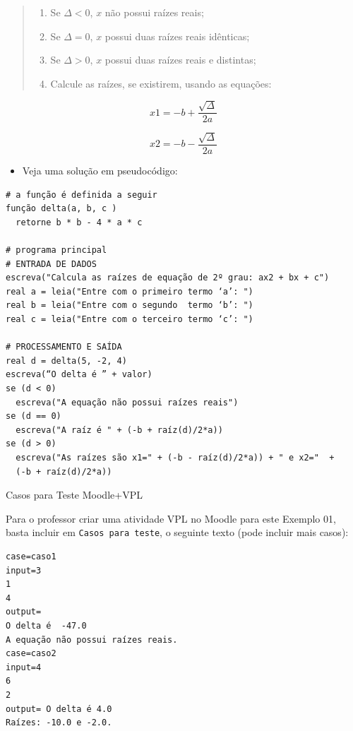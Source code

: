 \documentclass[12pt,a4paper]{article}
\providecommand{\tightlist}{%
      \setlength{\itemsep}{0pt}\setlength{\parskip}{0pt}}
\begin{document}
\begin{quote}
\begin{enumerate}
\def\labelenumi{\arabic{enumi}.}
\tightlist
\item
  Se \(\Delta<0\), \(x\) não possui raízes reais;
\item
  Se \(\Delta=0\), \(x\) possui duas raízes reais idênticas;
\item
  Se \(\Delta>0\), \(x\) possui duas raízes reais e distintas;
\item
  Calcule as raízes, se existirem, usando as equações:
\end{enumerate}
\end{quote}

\[x1 = -b+\frac{\sqrt{\Delta}}{2a}\]

\[x2 = -b-\frac{\sqrt{\Delta}}{2a}\]

\begin{itemize}
\tightlist
\item
  Veja uma solução em pseudocódigo:
\end{itemize}

    \begin{verbatim}
# a função é definida a seguir
função delta(a, b, c )
  retorne b * b - 4 * a * c

# programa principal  
# ENTRADA DE DADOS
escreva("Calcula as raízes de equação de 2º grau: ax2 + bx + c")
real a = leia("Entre com o primeiro termo ‘a’: ")
real b = leia("Entre com o segundo  termo ‘b’: ")
real c = leia("Entre com o terceiro termo ‘c’: ")

# PROCESSAMENTO E SAÍDA
real d = delta(5, -2, 4)
escreva(“O delta é ” + valor)
se (d < 0)  
  escreva("A equação não possui raízes reais")
se (d == 0)
  escreva("A raíz é " + (-b + raíz(d)/2*a))
se (d > 0)  
  escreva("As raízes são x1=" + (-b - raíz(d)/2*a)) + " e x2="  +
  (-b + raíz(d)/2*a))
\end{verbatim}

    Casos para Teste Moodle+VPL

Para o professor criar uma atividade VPL no Moodle para este Exemplo 01,
basta incluir em \texttt{Casos\ para\ teste}, o seguinte texto (pode
incluir mais casos):

\begin{verbatim}
case=caso1
input=3
1
4
output=
O delta é  -47.0
A equação não possui raízes reais.
case=caso2
input=4
6
2
output= O delta é 4.0
Raízes: -10.0 e -2.0.
\end{verbatim}
\end{document}
